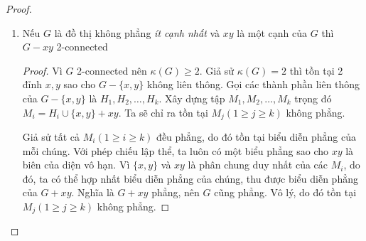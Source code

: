 \begin{proof}
\begin{enumerate}
\begin{proof}
\begin{figure}[H]
                      \caption*{Ví dụ phép chiếu lập thể từ mặt cầu đến mặt phẳng }
                  \end{figure}
                  Vậy, nếu $G$ là đồ thị không phẳng cực tiểu thì $G$ 2-connected.

              \end{proof}

        \item Nếu $G$ là đồ thị không phẳng \textit{ít cạnh nhất} và $xy$ là một cạnh của $G$ thì $G-xy$ 2-connected
              \begin{proof}
                  Vì $G$ 2-connected nên $\kappa(G) \geq 2$. Giả sử $\kappa(G) =2$ thì tồn tại 2 đỉnh $x,y$ sao cho $G-\{x,y\}$ không liên thông.
                  Gọi các thành phần liên thông của $G-\{x,y\}$ là $H_1, H_2, \ldots,H_k$. Xây dựng tập $M_1,M_2,\ldots,M_k$ trọng đó $M_i=H_i \cup \{x,y\} +xy$.
                  Ta sẽ chỉ ra tồn tại $M_j (1 \geq j \geq k)$ không phẳng.

                  Giả sử tất cả $M_i (1 \geq i \geq k)$ đều phẳng, do đó tồn tại biểu diễn phẳng của mỗi chúng. Với phép chiếu lập thể, ta luôn có một biểu phẳng sao cho $xy$ là biên của diện vô hạn.
                  Vì $\{x,y\}$ và $xy$ là phân chung duy nhất của các $M_i$, do đó, ta có thể hợp nhất biểu diễn phẳng của chúng, thu được biểu diễn phẳng của $G+xy$.
                  Nghĩa là $G+xy$ phẳng, nên $G$ cũng phẳng. Vô lý, do đó tồn tại $M_j (1 \geq j \geq k)$ không phẳng.


\end{proof}
\end{enumerate}
\end{proof}
